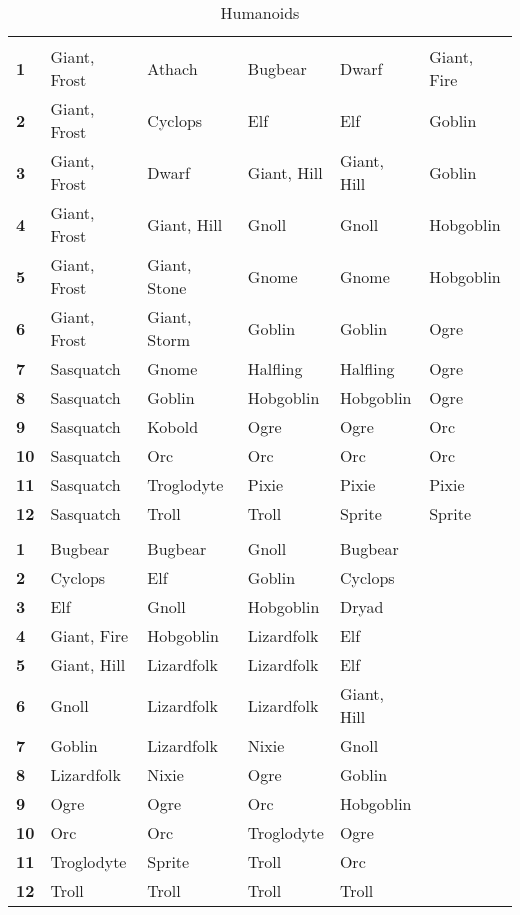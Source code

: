 \begin {table}[H]
  \caption{Humanoids}
  \begin{tabularx}{\columnwidth}{>{\bfseries}YYYYYY}
	 &  &  &  &  & \\
	1 & Giant, Frost & Athach & Bugbear & Dwarf & Giant, Fire\\
	2 & Giant, Frost & Cyclops & Elf & Elf & Goblin\\
	3 & Giant, Frost & Dwarf & Giant, Hill & Giant, Hill & Goblin\\
	4 & Giant, Frost & Giant, Hill & Gnoll & Gnoll & Hobgoblin\\
	5 & Giant, Frost & Giant, Stone & Gnome & Gnome & Hobgoblin\\
	6 & Giant, Frost & Giant, Storm & Goblin & Goblin & Ogre\\
	7 & Sasquatch & Gnome & Halfling & Halfling & Ogre\\
	8 & Sasquatch & Goblin & Hobgoblin & Hobgoblin & Ogre\\
	9 & Sasquatch & Kobold & Ogre & Ogre & Orc\\
	10 & Sasquatch & Orc & Orc & Orc & Orc\\
	11 & Sasquatch & Troglodyte & Pixie & Pixie & Pixie\\
	12 & Sasquatch & Troll & Troll & Sprite & Sprite\\
	 &  &  &  & \\
	1 & Bugbear & Bugbear & Gnoll & Bugbear\\
	2 & Cyclops & Elf & Goblin & Cyclops\\
	3 & Elf & Gnoll & Hobgoblin & Dryad\\
	4 & Giant, Fire & Hobgoblin & Lizardfolk & Elf\\
	5 & Giant, Hill & Lizardfolk & Lizardfolk & Elf\\
	6 & Gnoll & Lizardfolk & Lizardfolk & Giant, Hill\\
	7 & Goblin & Lizardfolk & Nixie & Gnoll\\
	8 & Lizardfolk & Nixie & Ogre & Goblin\\
	9 & Ogre & Ogre & Orc & Hobgoblin\\
	10 & Orc & Orc & Troglodyte & Ogre\\
	11 & Troglodyte & Sprite & Troll & Orc\\
	12 & Troll & Troll & Troll & Troll
  \end {tabularx}
\end {table}

